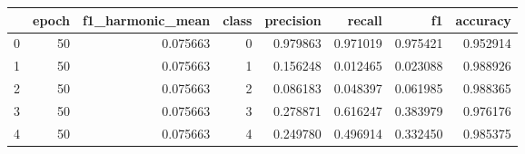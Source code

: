 \begin{tabular}{lrrrrrrr}
\toprule
 & epoch & f1_harmonic_mean & class & precision & recall & f1 & accuracy \\
\midrule
0 & 50 & 0.075663 & 0 & 0.979863 & 0.971019 & 0.975421 & 0.952914 \\
1 & 50 & 0.075663 & 1 & 0.156248 & 0.012465 & 0.023088 & 0.988926 \\
2 & 50 & 0.075663 & 2 & 0.086183 & 0.048397 & 0.061985 & 0.988365 \\
3 & 50 & 0.075663 & 3 & 0.278871 & 0.616247 & 0.383979 & 0.976176 \\
4 & 50 & 0.075663 & 4 & 0.249780 & 0.496914 & 0.332450 & 0.985375 \\
\bottomrule
\end{tabular}
